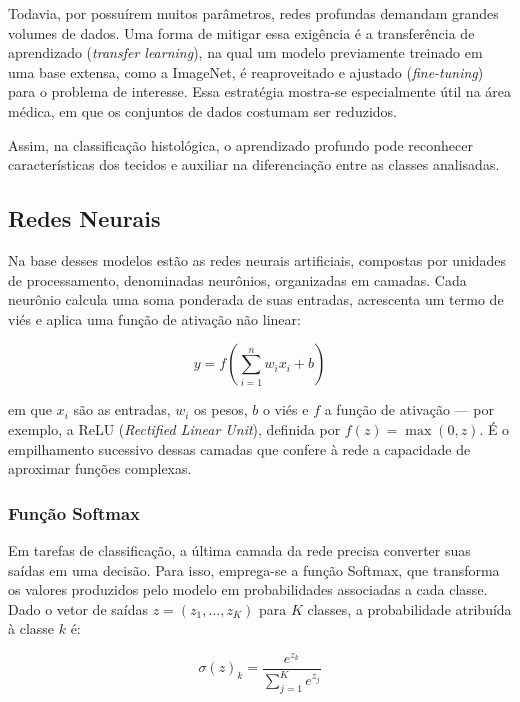 Todavia, por possuírem muitos parâmetros, redes profundas demandam grandes volumes de dados. Uma forma de mitigar essa exigência é a transferência de aprendizado (\textit{transfer learning}), na qual um modelo previamente treinado em uma base extensa, como a ImageNet, é reaproveitado e ajustado (\textit{fine-tuning}) para o problema de interesse. Essa estratégia mostra-se especialmente útil na área médica, em que os conjuntos de dados costumam ser reduzidos. %

Assim, na classificação histológica, o aprendizado profundo pode reconhecer características dos tecidos e auxiliar na diferenciação entre as classes analisadas.

\subsection{Redes Neurais}
\hspace{+15pt}

Na base desses modelos estão as redes neurais artificiais, compostas por unidades de processamento, denominadas neurônios, organizadas em camadas. Cada neurônio calcula uma soma ponderada de suas entradas, acrescenta um termo de viés e aplica uma função de ativação não linear:

\begin{equation}
y = f\left(\sum_{i=1}^{n} w_i x_i + b\right)
\end{equation}

\noindent em que $x_i$ são as entradas, $w_i$ os pesos, $b$ o viés e $f$ a função de ativação — por exemplo, a ReLU (\textit{Rectified Linear Unit}), definida por $f(z) = \max(0, z)$. É o empilhamento sucessivo dessas camadas que confere à rede a capacidade de aproximar funções complexas. %

\subsubsection{Função Softmax}
\hspace{+15pt}

Em tarefas de classificação, a última camada da rede precisa converter suas saídas em uma decisão. Para isso, emprega-se a função Softmax, que transforma os valores produzidos pelo modelo em probabilidades associadas a cada classe. Dado o vetor de saídas $z = (z_1, \dots, z_K)$ para $K$ classes, a probabilidade atribuída à classe $k$ é:

\begin{equation}
\sigma(z)_k = \frac{e^{z_k}}{\sum_{j=1}^{K} e^{z_j}}
\end{equation}

